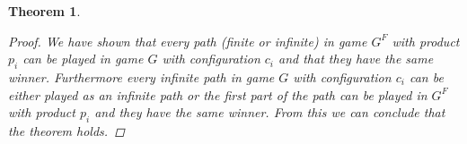 \documentclass[]{article}
\newtheorem{theorem}{Theorem}[section]
\begin{document}
\begin{theorem}
\begin{proof}
We have shown that every path (finite or infinite) in game $G^F$ with product $p_i$ can be played in game $G$ with configuration $c_i$ and that they have the same winner. Furthermore every infinite path in game $G$ with configuration $c_i$ can be either played as an infinite path or the first part of the path can be played in $G^F$ with product $p_i$ and they have the same winner. From this we can conclude that the theorem holds.
\end{proof}
\end{theorem}
 

\end{document}
